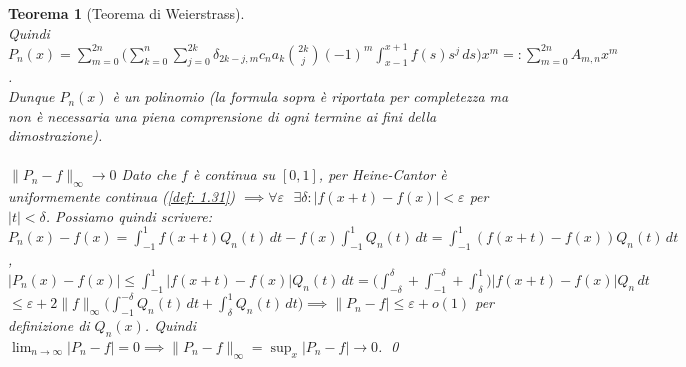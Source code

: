 \documentclass[a4paper,12pt]{report}
\newtheorem{teorema}{Teorema}[chapter]
\newcommand{\lt}{<}
\begin{document}
\begin{teorema}[Teorema di Weierstrass]
    \\Quindi $P_n(x)=\displaystyle\sum_{m=0}^{2n}\bigg(\sum_{k=0}^n\sum_{j=0}^{2k}\delta_{2k-j,m}c_na_k\binom{2k}{j}(-1)^m\int_{x-1}^{x+1}f(s)s^j\,ds\bigg)x^m=:\sum_{m=0}^{2n}A_{m,n}x^m$.
    \\ Dunque $P_n(x)$ è un polinomio (la formula sopra è riportata per completezza ma non è necessaria una piena comprensione di ogni termine ai fini della dimostrazione).
    \\
    \\ $\boxed{\|P_n-f\|_\infty\to0}$ Dato che $f$ è continua su $[0,1]$, per Heine-Cantor è uniformemente continua (\ref{def: 1.31}) $\implies \forall \varepsilon\ \ \ \exists\delta:|f(x+t)-f(x)|\lt\varepsilon$ per $|t|\lt\delta$. Possiamo quindi scrivere:
    \\$P_n(x)-f(x)=\displaystyle\int_{-1}^1f(x+t)Q_n(t)\,dt-f(x)\int_{-1}^1Q_n(t)\,dt=\int_{-1}^1(f(x+t)-f(x))Q_n(t)\,dt$,
    \\\mbox{$ |P_n(x)-f(x)|\leq\displaystyle\int_{-1}^1|f(x+t)-f(x)|Q_n(t)\,dt=\bigg(\int_{-\delta}^\delta+\int_{-1}^{-\delta}+\int_\delta^1\bigg)|f(x+t)-f(x)|Q_n\,dt$} 
    $\leq \varepsilon +2\|f\|_\infty\displaystyle\bigg(\int_{-1}^{-\delta}Q_n(t)\,dt+\int_\delta^1Q_n(t)\,dt\bigg)\implies\|P_n-f|\leq \varepsilon +o(1)$ per definizione di $Q_n(x)$.
    Quindi $\displaystyle\lim_{n\to\infty}|P_n-f|= 0\implies\|P_n-f\|_\infty=\sup_x|P_n-f|\to0$. \qed
\end{teorema}
\end{document}
